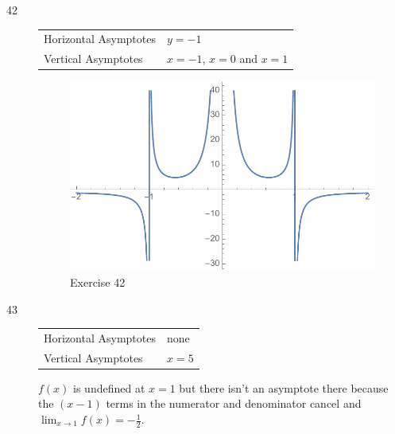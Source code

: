 \documentclass[letterpaper, landscape]{exam}
\begin{document}
\begin{description}
      \item[42]
        \begin{tabular}[H]{ll}
          \toprule
          Horizontal Asymptotes & $y = -1$ \\
          Vertical Asymptotes   & $x = -1$, $x = 0$ and $x = 1$ \\
          \bottomrule
        \end{tabular}

        \begin{figure}[H]
          \centering
          \includegraphics[scale = 0.5]{ex42.pdf}
          \caption{Exercise 42}
          \label{fig:ex42}
        \end{figure}

      \newpage

      \item[43]
        \begin{tabular}[H]{ll}
          \toprule
          Horizontal Asymptotes & none \\
          Vertical Asymptotes   & $x = 5$ \\
          \bottomrule
        \end{tabular}

        $f(x)$ is undefined at $x = 1$ but there isn't an asymptote there because the
        $(x - 1)$ terms in the numerator and denominator cancel and 
        $\lim_{x \to 1} f(x) = -\frac{1}{2}$.


\end{description}
\end{document}
